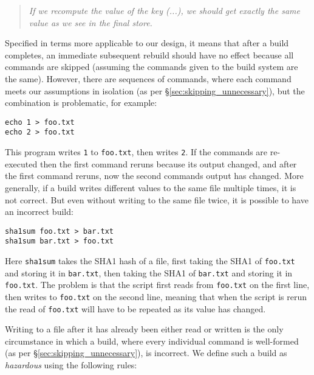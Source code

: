 \begin{quote}
\emph{If we recompute the value of the key (...), we should get exactly the same value as we see in the final store.}
\end{quote}

Specified in terms more applicable to our design, it means that after a build completes, an immediate subsequent rebuild should have no effect because all commands are skipped (assuming the commands given to the build system are the same). However, there are sequences of commands, where each command meets our assumptions in isolation (as per \S\ref{sec:skipping_unnecessary}), but the combination is problematic, for example:

\vspace{1mm}
\begin{verbatim}
echo 1 > foo.txt
echo 2 > foo.txt
\end{verbatim}
\vspace{1mm}

This program writes \texttt{1} to \texttt{foo.txt}, then writes \texttt{2}. If the commands are re-executed then the first command reruns because its output changed, and after the first command reruns, now the second commands output has changed. More generally, if a build writes different values to the same file multiple times, it is not correct. But even without writing to the same file twice, it is possible to have an incorrect build:

\vspace{1mm}
\begin{verbatim}
sha1sum foo.txt > bar.txt
sha1sum bar.txt > foo.txt
\end{verbatim}
\vspace{1mm}

Here \texttt{sha1sum} takes the SHA1 hash of a file, first taking the SHA1 of \texttt{foo.txt} and storing it in \texttt{bar.txt}, then taking the SHA1 of \texttt{bar.txt} and storing it in \texttt{foo.txt}. The problem is that the script first reads from \texttt{foo.txt} on the first line, then writes to \texttt{foo.txt} on the second line, meaning that when the script is rerun the read of \texttt{foo.txt} will have to be repeated as its value has changed.

Writing to a file after it has already been either read or written is the only circumstance in which a build, where every individual command is well-formed (as per \S\ref{sec:skipping_unnecessary}), is incorrect. We define such a build as \emph{hazardous} using the following rules:

